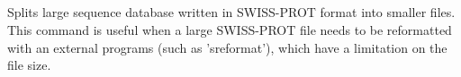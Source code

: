 

\subsection[sprot\_split]{  }



Splits large sequence database written in SWISS-PROT format
into smaller files. This command is useful when a large SWISS-PROT
file needs to be reformatted with an external programs (such as
'sreformat'), which have a limitation on the file size. 


